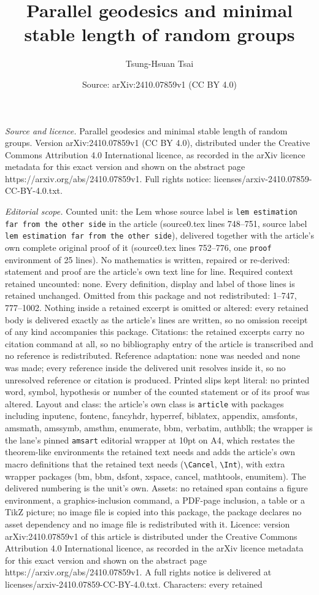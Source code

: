 \documentclass[10pt,a4paper]{amsart}
\title[Parallel geodesics and minimal stable length of random group]{Parallel geodesics and minimal stable length of random groups}
\author{Tsung-Hsuan Tsai}
\date{Source: arXiv:2410.07859v1 (CC BY 4.0)}
\begin{document}
\maketitle

\noindent\emph{Source and licence.} Parallel geodesics and minimal stable length of random groups. Version arXiv:2410.07859v1 (CC BY 4.0), distributed under the Creative Commons Attribution 4.0 International licence, as recorded in the arXiv licence metadata for this exact version and shown on the abstract page https://arxiv.org/abs/2410.07859v1. Full rights notice: licenses/arxiv-2410.07859-CC-BY-4.0.txt.\par\smallskip

\noindent\textit{Editorial scope.} Counted unit: the Lem whose source label is \texttt{lem estimation far from the other side} in the article (source0.tex lines 748--751, source label \texttt{lem estimation far from the other side}), delivered together with the article's own complete original proof of it (source0.tex lines 752--776, one \texttt{proof} environment of 25 lines). No mathematics is written, repaired or re-derived: statement and proof are the article's own text line for line. Required context retained uncounted: none. Every definition, display and label of those lines is retained unchanged. Omitted from this package and not redistributed: 1--747, 777--1002. Nothing inside a retained excerpt is omitted or altered: every retained body is delivered exactly as the article's lines are written, so no omission receipt of any kind accompanies this package. Citations: the retained excerpts carry no citation command at all, so no bibliography entry of the article is transcribed and no reference is redistributed. Reference adaptation: none was needed and none was made; every reference inside the delivered unit resolves inside it, so no unresolved reference or citation is produced. Printed slips kept literal: no printed word, symbol, hypothesis or number of the counted statement or of its proof was altered. Layout and class: the article's own class is \texttt{article} with packages including inputenc, fontenc, fancyhdr, hyperref, biblatex, appendix, amsfonts, amsmath, amssymb, amsthm, enumerate, bbm, verbatim, authblk; the wrapper is the lane's pinned \texttt{amsart} editorial wrapper at 10pt on A4, which restates the theorem-like environments the retained text needs and adds the article's own macro definitions that the retained text needs (\texttt{\textbackslash Cancel}, \texttt{\textbackslash Int}), with extra wrapper packages (bm, bbm, dsfont, xspace, cancel, mathtools, enumitem). The delivered numbering is the unit's own. Assets: no retained span contains a figure environment, a graphics-inclusion command, a PDF-page inclusion, a table or a TikZ picture; no image file is copied into this package, the package declares no asset dependency and no image file is redistributed with it. Licence: version arXiv:2410.07859v1 of this article is distributed under the Creative Commons Attribution 4.0 International licence, as recorded in the arXiv licence metadata for this exact version and shown on the abstract page https://arxiv.org/abs/2410.07859v1. A full rights notice is delivered at licenses/arxiv-2410.07859-CC-BY-4.0.txt. Characters: every retained 
\end{document}
